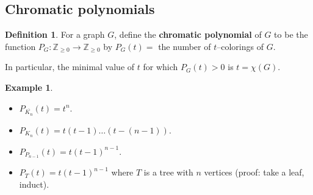 \documentclass{article}
\theoremstyle{definition}
\newtheorem{example}{Example}[section]
\newtheorem{defn}{Definition}[section]
\begin{document}
\subsection{Chromatic polynomials}
\begin{defn}
    For a graph $G$, define the \textbf{chromatic polynomial} of $G$ to be the function $P_G : \mathbb{Z}_{\ge 0} \to \mathbb{Z}_{\ge 0}$ by $P_G(t) = $ the number of $t$--colorings of $G$.

    In particular, the minimal value of $t$ for which $P_G(t)>0$ is $t = \chi(G)$.
\end{defn}
\begin{example}
    \begin{itemize}
        \item $P_{\overline{K_n}}(t)=t^n$.
        \item $P_{K_n}(t)=t(t-1)\ldots(t-(n-1))$.
        \item $P_{P_{n-1}}(t)=t(t-1)^{n-1}$.
        \item $P_T(t)=t(t-1)^{n-1}$ where $T$ is a tree with $n$ vertices (proof: take a leaf, induct).
    \end{itemize}
\end{example}
\end{document}
